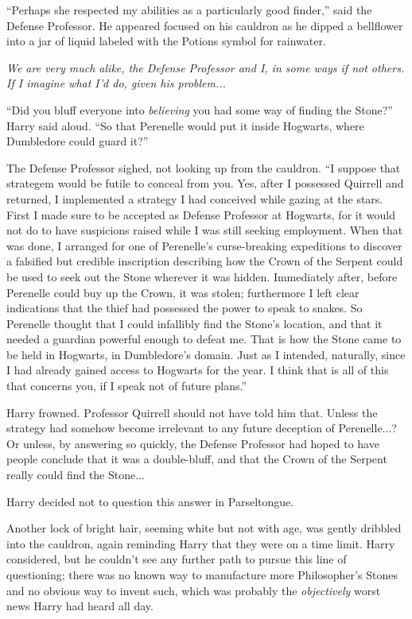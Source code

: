 ``Perhaps she respected my abilities as a particularly good finder,'' said the Defense Professor. He appeared focused on his cauldron as he dipped a bellflower into a jar of liquid labeled with the Potions symbol for rainwater.

\emph{We are very much alike, the Defense Professor and I, in some ways if not others. If I imagine what I'd do, given his problem...}

``Did you bluff everyone into \emph{believing} you had some way of finding the Stone?'' Harry said aloud. ``So that Perenelle would put it inside Hogwarts, where Dumbledore could guard it?''

The Defense Professor sighed, not looking up from the cauldron. ``I suppose that strategem would be futile to conceal from you. Yes, after I possessed Quirrell and returned, I implemented a strategy I had conceived while gazing at the stars. First I made sure to be accepted as Defense Professor at Hogwarts, for it would not do to have suspicions raised while I was still seeking employment. When that was done, I arranged for one of Perenelle's curse-breaking expeditions to discover a falsified but credible inscription describing how the Crown of the Serpent could be used to seek out the Stone wherever it was hidden. Immediately after, before Perenelle could buy up the Crown, it was stolen; furthermore I left clear indications that the thief had possessed the power to speak to snakes. So Perenelle thought that I could infallibly find the Stone's location, and that it needed a guardian powerful enough to defeat me. That is how the Stone came to be held in Hogwarts, in Dumbledore's domain. Just as I intended, naturally, since I had already gained access to Hogwarts for the year. I think that is all of this that concerns you, if I speak not of future plans.''

Harry frowned. Professor Quirrell should not have told him that. Unless the strategy had somehow become irrelevant to any future deception of Perenelle...? Or unless, by answering so quickly, the Defense Professor had hoped to have people conclude that it was a double-bluff, and that the Crown of the Serpent really could find the Stone...

Harry decided not to question this answer in Parseltongue.

Another lock of bright hair, seeming white but not with age, was gently dribbled into the cauldron, again reminding Harry that they were on a time limit. Harry considered, but he couldn't see any further path to pursue this line of questioning; there was no known way to manufacture more Philosopher's Stones and no obvious way to invent such, which was probably the \emph{objectively} worst news Harry had heard all day.

